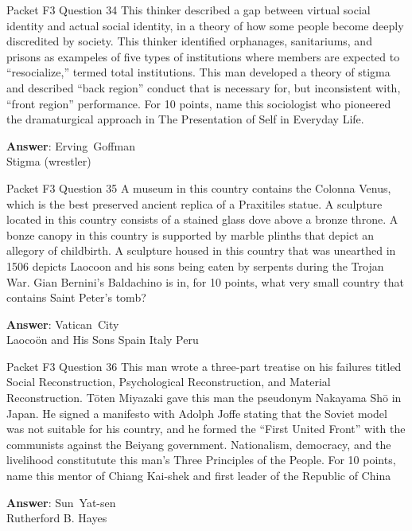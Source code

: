 \begin{frame}{Packet F3 Question 34}
This thinker described a gap between virtual social identity and actual social identity, in a theory of   how some people become deeply discredited by society. This thinker identified orphanages, sanitariums, and prisons as exampeles of five types of institutions where members are expected to ``resocialize,'' termed total institutions. This man   developed a theory of stigma and described ``back region'' conduct that is necessary for, but inconsistent with, ``front region'' performance. For 10 points, name this sociologist who   pioneered the dramaturgical approach in     The Presentation of Self in Everyday Life.

\textbf{Answer}: Erving\ Goffman\\
 Stigma (wrestler)
\end{frame}

\begin{frame}{Packet F3 Question 35}
A museum in this country contains the Colonna Venus, which is the best preserved ancient replica of a Praxitiles statue. A sculpture located in this country consists of a stained glass dove above a bronze throne. A bonze canopy in this country is supported by marble plinths that depict an allegory of childbirth. A sculpture housed in this country that was unearthed in 1506 depicts Laocoon and his sons being eaten by serpents during the Trojan War. Gian Bernini's Baldachino is in,   for 10 points, what very small country that contains Saint Peter's tomb?      

\textbf{Answer}: Vatican\ City\\
 Laocoön and His Sons
 Spain
 Italy
 Peru
\end{frame}

\begin{frame}{Packet F3 Question 36}
This man wrote a three-part treatise on his failures titled Social Reconstruction, Psychological Reconstruction, and Material   Reconstruction. Tōten Miyazaki gave this man the pseudonym Nakayama Shō in Japan.   He signed a manifesto with Adolph Joffe stating that the Soviet model was not suitable for his   country, and he formed the “First United Front” with the communists against the Beiyang government. Nationalism, democracy,   and the livelihood constitutute this man's Three Principles of the People.   For 10 points, name this mentor of Chiang Kai-shek and first leader of the Republic of China

\textbf{Answer}: Sun\ Yat-sen\\
 Rutherford B. Hayes
\end{frame}

